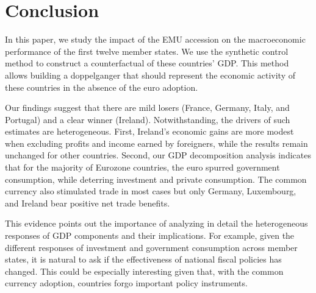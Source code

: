 \documentclass[12pt]{article}
\begin{document}
\section{Conclusion \label{S_Conclusion}}
In this paper, we study the impact of the EMU accession on the macroeconomic performance of the first twelve member states. We use the synthetic control method to construct a counterfactual of these countries' GDP. This method allows building a doppelganger that should represent the economic activity of these countries in the absence of the euro adoption. 

Our findings suggest that there are mild losers (France, Germany, Italy, and Portugal) and a clear winner (Ireland). Notwithstanding, the drivers of such estimates are heterogeneous.  First, Ireland's economic gains are more modest when excluding profits and income earned by foreigners, while the results remain unchanged for other countries. Second,  our GDP decomposition analysis indicates that for the majority of Eurozone countries, the euro spurred government consumption, while deterring investment and private consumption. The common currency also stimulated trade in most cases but only Germany, Luxembourg, and Ireland bear positive net trade benefits.  

This evidence points out the importance of analyzing in detail the heterogeneous responses of GDP components and their implications. For example, given the different responses of investment and government consumption across member states, it is natural to ask if the effectiveness of national fiscal policies has changed. This could be especially interesting given that, with the common currency adoption, countries forgo important policy instruments.



\end{document}
